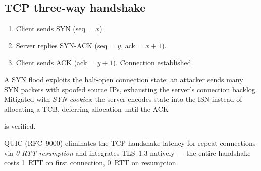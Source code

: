 \documentclass[12pt,a4paper]{article}
\newcommand{\ic}[1]{%
  \mbox{\colorbox{AnthCodeBG}{\footnotesize\ttfamily\textcolor{AnthBlue}{#1}}}%
}
\newenvironment{Note}[1][Note]{%
  \begin{tcolorbox}[notebox, title=#1]}{\end{tcolorbox}}
\newenvironment{Warn}[1][Warning]{%
  \begin{tcolorbox}[warnbox, title=#1]}{\end{tcolorbox}}
\begin{document}
\subsection{TCP three-way handshake}

\begin{enumerate}
  \item Client sends \ic{SYN} (seq = $x$).
  \item Server replies \ic{SYN-ACK} (seq = $y$, ack = $x+1$).
  \item Client sends \ic{ACK} (ack = $y+1$). Connection established.
\end{enumerate}

\begin{Warn}[SYN flood attacks]
  A SYN flood exploits the half-open connection state: an attacker sends many
  \ic{SYN} packets with spoofed source IPs, exhausting the server's connection
  backlog. Mitigated with \emph{SYN cookies}: the server encodes state into the
  \ic{ISN} instead of allocating a TCB, deferring allocation until the \ic{ACK}
  is verified.
\end{Warn}

\begin{Note}
  QUIC (RFC~9000) eliminates the TCP handshake latency for repeat connections via
  \emph{0-RTT resumption} and integrates TLS~1.3 natively — the entire handshake
  costs 1~RTT on first connection, 0~RTT on resumption.
\end{Note}
\end{document}
